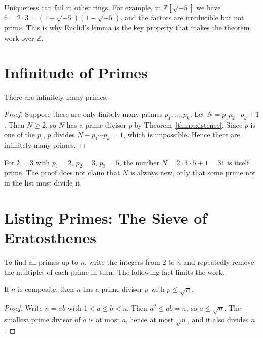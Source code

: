 \begin{remark}
Uniqueness can fail in other rings. For example, in $\mathbb{Z}[\sqrt{-5}]$ we have $6 = 2\cdot 3 = (1+\sqrt{-5})(1-\sqrt{-5})$, and the factors are irreducible but not prime. This is why Euclid's lemma is the key property that makes the theorem work over $\mathbb{Z}$.
\end{remark}

\section{Infinitude of Primes}

\begin{theorem}[Euclid]\label{thm:infinite}
There are infinitely many primes.
\end{theorem}

\begin{proof}
Suppose there are only finitely many primes $p_1,\dots,p_k$. Let $N=p_1p_2\cdots p_k+1$. Then $N\ge 2$, so $N$ has a prime divisor $p$ by Theorem~\ref{thm:existence}. Since $p$ is one of the $p_i$, $p$ divides $N-p_1\cdots p_k=1$, which is impossible. Hence there are infinitely many primes.
\end{proof}

\begin{example}
For $k=3$ with $p_1=2$, $p_2=3$, $p_3=5$, the number $N=2\cdot 3\cdot 5+1=31$ is itself prime. The proof does not claim that $N$ is always new, only that some prime not in the list must divide it.
\end{example}

\section{Listing Primes: The Sieve of Eratosthenes}

To find all primes up to $n$, write the integers from $2$ to $n$ and repeatedly remove the multiples of each prime in turn. The following fact limits the work.

\begin{lemma}\label{lem:sqrt}
If $n$ is composite, then $n$ has a prime divisor $p$ with $p\le \sqrt{n}$.
\end{lemma}

\begin{proof}
Write $n=ab$ with $1<a\le b<n$. Then $a^2\le ab=n$, so $a\le\sqrt{n}$. The smallest prime divisor of $a$ is at most $a$, hence at most $\sqrt{n}$, and it also divides $n$.
\end{proof}

